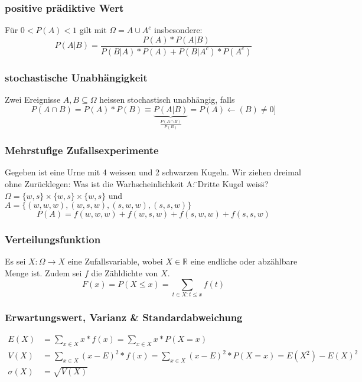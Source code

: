 \documentclass[landscape,twocolumn,a4paper]{article}
\newcommand{\RN}{\mathbb{R}} %
\begin{document}
\subsubsection*{positive prädiktive Wert}
Für $0 < P(A) < 1$ gilt mit $\Omega = A \cup A^c$ insbesondere:
\begin{equation*}
	 P(A | B) = \frac{P(A)*P(A | B)}{P(B | A) * P(A) + P(B | A^c) * P(A^c)}
\end{equation*}

\subsubsection*{stochastische Unabhängigkeit}
Zwei Ereignisse $A,B \subseteq \Omega$ heissen stochastisch unabhängig, falls 
\begin{equation*}
	P(A \cap B) = P(A) * P(B)  \equiv \underbrace{P(A|B)}_{\frac{P(A \cap B)}{P(B)}}=P(A) \leftarrow (B) \neq 0]
\end{equation*}

\subsubsection*{Mehrstufige Zufallsexperimente}
Gegeben ist eine Urne mit 4 weissen und 2 schwarzen Kugeln. Wir ziehen dreimal ohne Zurücklegen: Was ist die Warhscheinlichkeit A: \"{ }Dritte Kugel weiss\"{}? \\
$\Omega = \{w,s\} \times \{w,s\} \times \{w,s\}$ und $A= \{(w,w,w),(w,s,w),(s,w,w),(s,s,w)\}$
\begin{equation*}
	P(A) = f(w,w,w) + f(w,s,w) + f(s,w,w) + f(s,s,w)
\end{equation*}

\subsubsection*{Verteilungsfunktion}
Es sei $X : \Omega \rightarrow X$ eine Zufallsvariable, wobei $X \in \RN$ eine endliche oder abzählbare Menge ist. Zudem sei $f$ die Zähldichte von $X$.
\begin{equation*}
	F(x)=P(X \leq x) = \sum_{t \in X:t \leq x} f(t)
\end{equation*}

\subsubsection*{Erwartungswert, Varianz \& Standardabweichung}
\begin{align*}
	E(X) &=\sum_{x \in X} x * f(x)=\sum_{x \in X} x * P(X = x) \\
	V(X)&= \sum_{x \in X} (x - E)^2 * f(x) = \sum_{x \in X} (x - E)^2 * P(X=x) = E(X^2)-E(X)^2 \\
	\sigma(X) &= \sqrt{V(X)}
\end{align*}
\end{document}
